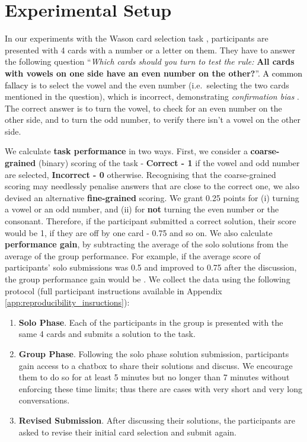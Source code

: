 \documentclass[acmsmall,manuscript,screen]{acmart}
\newcommand\newtext[1]{\textcolor{black}{#1}}
\begin{document}
\section{Experimental Setup}
\label{sec:experimental_setup}

In our experiments with the Wason card selection task \cite{wason1968reasoning}, participants are presented with 4 cards with a number or a letter on them. They have to answer the following question ``\textit{Which cards should you turn to test the rule:} \textbf{All cards with vowels on one side have an even number on the other?}''. \newtext{A common fallacy} is to 
select the vowel and the even number (i.e.\  selecting the two cards mentioned in the question), which is incorrect, demonstrating \textit{confirmation bias}  \citep{mercier2011humans}. The correct answer is to turn the vowel, to check for an even number on the other side, and to turn the odd number, to verify there isn't a vowel on the other side. \par
We calculate \textbf{task performance} in two ways. First, we consider a \textbf{coarse-grained} (binary) scoring of the task - \textbf{Correct - 1} if the vowel and odd number are selected, \textbf{Incorrect - 0} otherwise. Recognising that the coarse-grained scoring may needlessly penalise answers that are close to the correct one, we also devised an alternative \textbf{fine-grained} scoring. We grant 0.25 points for (i) turning a vowel or an odd number, and (ii) for \textbf{not} turning the even number or the consonant. Therefore, if the participant submitted a correct solution, their score would be 1, if they are off by one card - 0.75 and so on. We also calculate \textbf{performance gain}, by subtracting the average of the solo solutions from the average of the group performance. For example, if the average score of participants' solo submissions was 0.5 and 
improved to 0.75 after the discussion, the group performance gain would be . 
We collect the data using the following protocol (full participant instructions available \newtext{in} Appendix \ref{app:reproducibility_insructions}):
\begin{enumerate}
\item \textbf{Solo Phase}. Each of the participants in the group is presented with the same 4 cards and submits a solution to the task.
\item \textbf{Group Phase}. Following the solo phase solution submission,
participants gain access to a chatbox to share their solutions and discuss. We encourage them to do so
for at least 5 minutes
but no longer than 7 minutes without enforcing these time limits; thus there are cases with very short and very long conversations. 
\item \textbf{Revised Submission}. After discussing their solutions, the participants are asked to revise their initial card selection and submit again. 
\end{enumerate}
\end{document}
